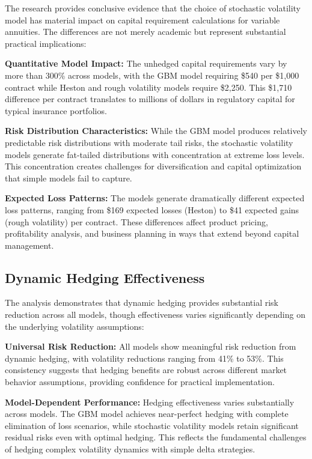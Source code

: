 \documentclass[12pt,a4paper]{report}
\begin{document}
The research provides conclusive evidence that the choice of stochastic volatility model has material impact on capital requirement calculations for variable annuities. The differences are not merely academic but represent substantial practical implications:

\textbf{Quantitative Model Impact:} The unhedged capital requirements vary by more than 300\% across models, with the GBM model requiring \$540 per \$1,000 contract while Heston and rough volatility models require \$2,250. This \$1,710 difference per contract translates to millions of dollars in regulatory capital for typical insurance portfolios.

\textbf{Risk Distribution Characteristics:} While the GBM model produces relatively predictable risk distributions with moderate tail risks, the stochastic volatility models generate fat-tailed distributions with concentration at extreme loss levels. This concentration creates challenges for diversification and capital optimization that simple models fail to capture.

\textbf{Expected Loss Patterns:} The models generate dramatically different expected loss patterns, ranging from \$169 expected losses (Heston) to \$41 expected gains (rough volatility) per contract. These differences affect product pricing, profitability analysis, and business planning in ways that extend beyond capital management.

\subsection{Dynamic Hedging Effectiveness}

The analysis demonstrates that dynamic hedging provides substantial risk reduction across all models, though effectiveness varies significantly depending on the underlying volatility assumptions:

\textbf{Universal Risk Reduction:} All models show meaningful risk reduction from dynamic hedging, with volatility reductions ranging from 41\% to 53\%. This consistency suggests that hedging benefits are robust across different market behavior assumptions, providing confidence for practical implementation.

\textbf{Model-Dependent Performance:} Hedging effectiveness varies substantially across models. The GBM model achieves near-perfect hedging with complete elimination of loss scenarios, while stochastic volatility models retain significant residual risks even with optimal hedging. This reflects the fundamental challenges of hedging complex volatility dynamics with simple delta strategies.
\end{document}
